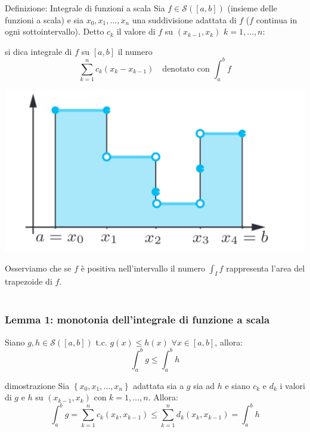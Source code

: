 \documentclass[x11names]{article}
\begin{document}
		\begin{center}
		\colorbox{myblue}{\begin{minipage}{5.75in}
				\begin{blues}{Definizione: Integrale di funzioni a scala}
					Sia $f \in \mathcal{S}\left(\left[a,b\right]\right)$ (insieme delle funzioni a scala) e sia $x_0, x_1, \dots, x_n$ una suddivisione adattata di $f$ ($f$ continua in ogni sottointervallo).  Detto $c_k$ il valore di $f$ su $\left(x_{k-1}, x_k\right)$ $k=1,\dots,n$:
					
					si dica integrale di $f$ su $\left[a,b\right]$ il numero
					\[
					\sum_{k=1}^{n}c_k (x_k - x_{k-1}) \quad \text{denotato con } \int_{a}^{b}f
					\]
				\end{blues}
		\end{minipage}}       
	\end{center}
	\begin{center}
		\includegraphics[scale=0.15]{figures/riemann}
	\end{center}
	Osserviamo che se $f$ è positiva nell'intervallo il numero $\int_{I}^{}f$ rappresenta l'area del trapezoide di $f$.  \\ \\
	
	\begin{center}
		\colorbox{myred}{\begin{minipage}{5.75in}
				\begin{redes}{}
					\subsubsection{Lemma 1: monotonia dell'integrale di funzione a scala}
					Siano $g,h \in \mathcal{S}\left(\left[a,b\right]\right)$ t.c. $g(x) \leq h(x)$ $\forall x \in \left[a,b\right]$, allora:
					\[
					\int_{a}^{b}g \leq \int_{a}^{b}h 
					\]
				\end{redes}
		\end{minipage}}        
	\end{center}
	\begin{es}{dimostrazione}
		Sia $\left\{x_0, x_1, \dots, x_n\right\}$ adattata sia a $g$ sia ad $h$ e siano $c_k$ e $d_k$ i valori di $g$ e $h$ su $\left(x_{k-1},x_k\right)$ con $k=1,\dots,n$. Allora:
		\[
		\int_{a}^{b}g = \sum_{k=1}^n c_k\left(x_k,x_{k-1}\right) \leq \sum_{k=1}^n d_k\left(x_k,x_{k-1}\right) = \int_{a}^{b}h 
		\]
	\end{es}
\end{document}
